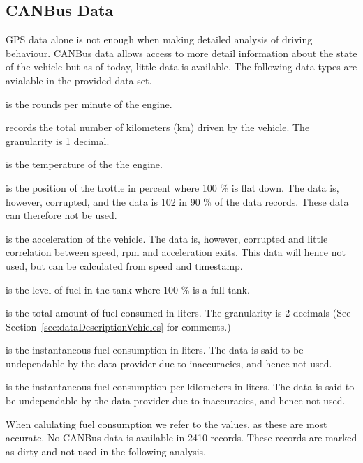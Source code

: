 \subsection{CANBus Data}
GPS data alone is not enough when making detailed analysis of driving behaviour.
CANBus data allows access to more detail information about the state of the vehicle but as of today, little data is available. 
The following data types are avialable in the provided data set.
\vspace{-5mm}
\begin{description*}
\item{} is the rounds per minute of the engine.
\item{} records the total number of kilometers (km) driven by the vehicle. The granularity is 1 decimal.
\item{} is the temperature of the the engine.
\item{} is the position of the trottle in percent where 100 \% is flat down. The data is, however, corrupted, and the data is 102 in 90 \% of the data records. These data can therefore not be used.%
\item{} is the acceleration of the vehicle. The data is, however, corrupted and little correlation between speed, rpm and acceleration exits. This data will hence not used, but can be calculated from speed and timestamp.
\item{} is the level of fuel in the tank where 100 \% is a full tank.
\item{} is the total amount of fuel consumed in liters. The granularity is 2 decimals (See Section~\ref{sec:dataDescriptionVehicles} for comments.) 
\item{} is the instantaneous fuel consumption in liters. The data is said to be undependable by the data provider due to inaccuracies, and hence not used.
\item{} is the instantaneous fuel consumption per kilometers in liters. The data is said to be undependable by the data provider due to inaccuracies, and hence not used.
\end{description*}

When calulating fuel consumption we refer to the  values, as these are most accurate.
No CANBus data is available in 2410 records. These records are marked as dirty and not used in the following analysis.

